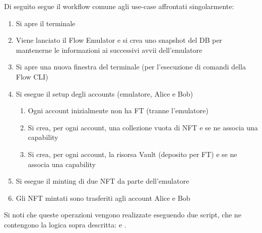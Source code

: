 Di seguito segue il workflow comune agli use-case affrontati singolarmente:
\begin{enumerate}
    \item Si apre il terminale
    \item Viene lanciato il Flow Emulator e si crea uno snapshot del DB per mantenerne le informazioni ai successivi avvii dell'emulatore
    \item Si apre una nuova finestra del terminale (per l'esecuzione di comandi della Flow CLI)
    \item Si esegue il setup degli accounts (emulatore, Alice e Bob)
    \begin{enumerate}
        \item Ogni account inizialmente non ha FT (tranne l'emulatore)
        \item Si crea, per ogni account, una collezione vuota di NFT e se ne associa una capability 
        \item Si crea, per ogni account, la risorsa Vault (deposito per FT) e se ne associa una capability
    \end{enumerate}
    \item Si esegue il minting di due NFT da parte dell'emulatore 
    \item Gli NFT mintati sono trasferiti agli account Alice e Bob
\end{enumerate}
Si noti che queste operazioni vengono realizzate eseguendo due script, che ne contengono la logica sopra descritta:  e  .






